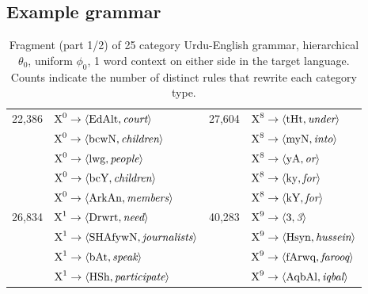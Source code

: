 \subsection{Example grammar}

\begin{table}[h]
\caption{Fragment (part 1/2) of 25 category Urdu-English grammar, hierarchical $\theta_0$, uniform $\phi_0$, 1 word context on either side in the target language. Counts indicate the number of distinct rules that rewrite each category type.}
\begin{center}
\begin{tabular}{|c|l|c|l|}
\hline
22,386 & $ \textrm{X}^{0} \rightarrow \langle \textrm{EdAlt},\textrm{{\emph court}} \rangle $ &27,604 & $ \textrm{X}^{8} \rightarrow \langle \textrm{tHt},\textrm{{\emph under}} \rangle $ \\
 & $ \textrm{X}^{0} \rightarrow \langle \textrm{bcwN},\textrm{{\emph children}} \rangle $ & & $ \textrm{X}^{8} \rightarrow \langle \textrm{myN},\textrm{{\emph into}} \rangle $ \\
 & $ \textrm{X}^{0} \rightarrow \langle \textrm{lwg},\textrm{{\emph people}} \rangle $ & & $ \textrm{X}^{8} \rightarrow \langle \textrm{yA},\textrm{{\emph or}} \rangle $ \\
 & $ \textrm{X}^{0} \rightarrow \langle \textrm{bcY},\textrm{{\emph children}} \rangle $ & & $ \textrm{X}^{8} \rightarrow \langle \textrm{ky},\textrm{{\emph for}} \rangle $ \\
 & $ \textrm{X}^{0} \rightarrow \langle \textrm{ArkAn},\textrm{{\emph members}} \rangle $ & & $ \textrm{X}^{8} \rightarrow \langle \textrm{kY},\textrm{{\emph for}} \rangle $ \\
\hline
26,834 & $ \textrm{X}^{1} \rightarrow \langle \textrm{Drwrt},\textrm{{\emph need}} \rangle $ &40,283 & $ \textrm{X}^{9} \rightarrow \langle \textrm{3},\textrm{{\emph 3}} \rangle $ \\
 & $ \textrm{X}^{1} \rightarrow \langle \textrm{SHAfywN},\textrm{{\emph journalists}} \rangle $ & & $ \textrm{X}^{9} \rightarrow \langle \textrm{Hsyn},\textrm{{\emph hussein}} \rangle $ \\
 & $ \textrm{X}^{1} \rightarrow \langle \textrm{bAt},\textrm{{\emph speak}} \rangle $ & & $ \textrm{X}^{9} \rightarrow \langle \textrm{fArwq},\textrm{{\emph farooq}} \rangle $ \\
 & $ \textrm{X}^{1} \rightarrow \langle \textrm{HSh},\textrm{{\emph participate}} \rangle $ & & $ \textrm{X}^{9} \rightarrow \langle \textrm{AqbAl},\textrm{{\emph iqbal}} \rangle $ \\

\end{tabular}
\end{center}
\end{table}
